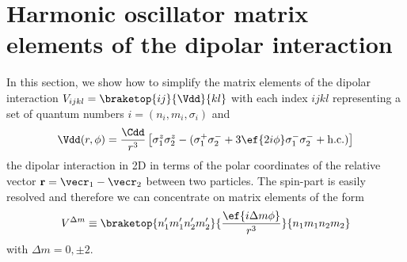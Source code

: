 \chapter{Harmonic oscillator matrix elements of the dipolar interaction}
\label{ap:matrix_elements}

In this section, we show how to simplify the matrix elements of the dipolar interaction $V_{ijkl}=\braketop{ij}{\Vdd}{kl}$ with each index $ijkl$ representing a set of quantum numbers $i=(n_i,m_i,\sigma_i)$ and
\begin{align*}
\Vdd(r,\phi) =  \frac{\Cdd}{r^3} \left[
\sigma^z_1 \sigma^z_2 - (\sigma^+_1 \sigma^-_2 +3 \ef{2i\phi} \sigma^-_1 \sigma^-_2  +\text{h.c.})
\right]
\end{align*}
the dipolar interaction in 2D in terms of the polar coordinates of the relative vector $\vec{r}=\vecr_1-\vecr_2$ between two particles. The spin-part is easily resolved and therefore we can concentrate on matrix elements of the form
\begin{align*}
V^{\Delta m}\equiv\braketop{n_1'm_1'n_2'm_2'}{\frac{\ef{i\Delta m\phi}}{r^3}}{n_1m_1n_2m_2}
\end{align*}
with $\Delta m = 0, \pm 2$.

